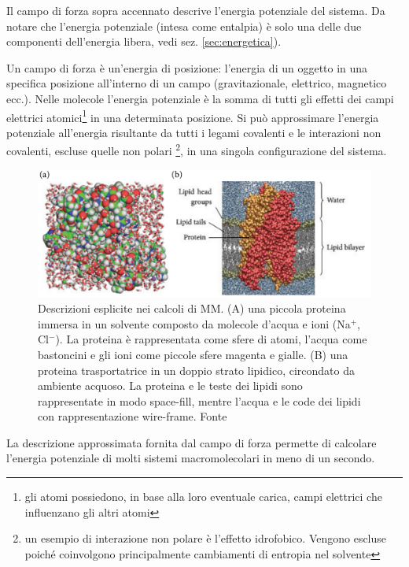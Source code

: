 {Il campo di forza sopra accennato descrive l'energia potenziale del sistema. Da notare che l'energia potenziale (intesa come entalpia) è solo una delle due componenti dell'energia libera, vedi sez. \ref{sec:energetica}).

\par Un campo di forza è un'energia di posizione: l'energia di un oggetto in una specifica posizione all'interno di un campo (gravitazionale, elettrico, magnetico ecc.). Nelle molecole l'energia potenziale è la somma di tutti gli effetti dei campi elettrici atomici\footnote{gli atomi possiedono, in base alla loro eventuale carica, campi elettrici che influenzano gli altri atomi} in una determinata posizione. Si può approssimare l'energia potenziale all'energia risultante da tutti i legami covalenti e le interazioni non covalenti, escluse quelle non polari \footnote{un esempio di interazione non polare è l'effetto idrofobico. Vengono escluse poiché coinvolgono principalmente cambiamenti di entropia nel solvente}, in una singola configurazione del sistema.

\begin{figure}[!htb]
	\centering
	\includegraphics[scale=0.4]{images/esplicita-mm.png}
	\caption{Descrizioni esplicite nei calcoli di MM. (A) una piccola proteina immersa in un solvente composto da molecole d'acqua e ioni (Na$^{+}$, Cl$^{-}$). La proteina è rappresentata come sfere di atomi, l'acqua come bastoncini e gli ioni come piccole sfere magenta e gialle. (B) una proteina trasportatrice in un doppio strato lipidico, circondato da ambiente acquoso. La proteina e le teste dei lipidi sono rappresentate in modo space-fill, mentre l'acqua e le code dei lipidi con rappresentazione wire-frame. Fonte \cite{kessel_ben-tal_2018}}
	\label{fig:descrizione-esplicita-mm}
\end{figure}

\par La descrizione approssimata fornita dal campo di forza permette di calcolare l'energia potenziale di molti sistemi macromolecolari in meno di un secondo. \\

}
